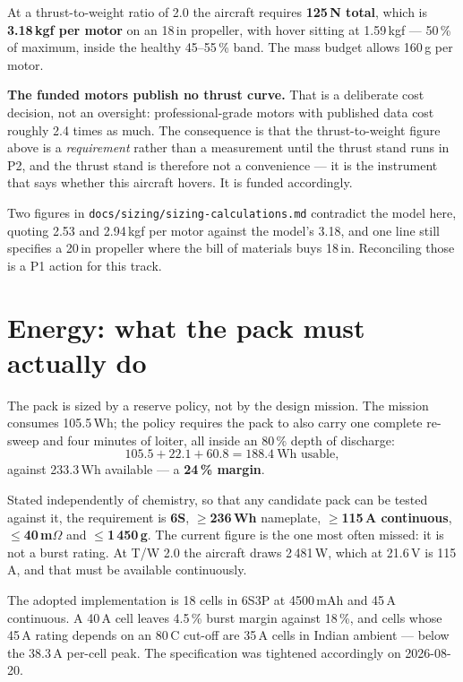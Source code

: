 \documentclass[11pt,a4paper]{article}
\begin{document}
At a thrust-to-weight ratio of 2.0 the aircraft requires \textbf{125\,N total},
which is \textbf{3.18\,kgf per motor} on an 18\,in propeller, with hover sitting
at 1.59\,kgf --- 50\,\% of maximum, inside the healthy 45--55\,\% band. The mass
budget allows 160\,g per motor.

\textbf{The funded motors publish no thrust curve.} That is a deliberate cost
decision, not an oversight: professional-grade motors with published data cost
roughly 2.4 times as much. The consequence is that the thrust-to-weight figure
above is a \emph{requirement} rather than a measurement until the thrust stand
runs in P2, and the thrust stand is therefore not a convenience --- it is the
instrument that says whether this aircraft hovers. It is funded accordingly.

Two figures in \texttt{docs/sizing/sizing-calculations.md} contradict the model
here, quoting 2.53 and 2.94\,kgf per motor against the model's 3.18, and one
line still specifies a 20\,in propeller where the bill of materials buys 18\,in.
Reconciling those is a P1 action for this track.

\section{Energy: what the pack must actually do}

The pack is sized by a reserve policy, not by the design mission. The mission
consumes 105.5\,Wh; the policy requires the pack to also carry one complete
re-sweep and four minutes of loiter, all inside an 80\,\% depth of discharge:
\[
105.5 + 22.1 + 60.8 = 188.4~\text{Wh usable},
\]
against 233.3\,Wh available --- a \textbf{24\,\% margin}.

Stated independently of chemistry, so that any candidate pack can be tested
against it, the requirement is \textbf{6S}, \textbf{$\geq$236\,Wh} nameplate,
\textbf{$\geq$115\,A continuous}, \textbf{$\leq$40\,m$\Omega$} and
\textbf{$\leq$1\,450\,g}. The current figure is the one most often missed: it is
not a burst rating. At T/W 2.0 the aircraft draws 2\,481\,W, which at 21.6\,V is
115\,A, and that must be available continuously.

The adopted implementation is 18 cells in 6S3P at 4500\,mAh and 45\,A
continuous. A 40\,A cell leaves 4.5\,\% burst margin against 18\,\%, and cells
whose 45\,A rating depends on an 80\,\textdegree C cut-off are 35\,A cells in
Indian ambient --- below the 38.3\,A per-cell peak. The specification was
tightened accordingly on 2026-08-20.
\end{document}
